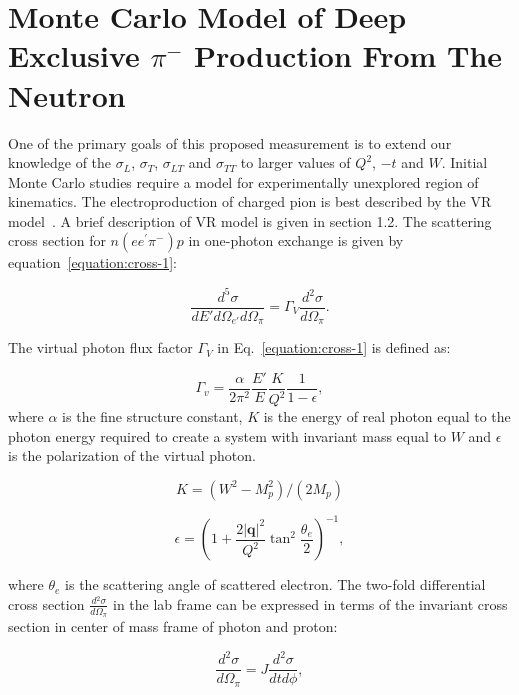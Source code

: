 
\section{Monte Carlo Model of Deep Exclusive $\pi^{-}$ Production From The Neutron}
One of the primary goals of this proposed measurement is to extend our knowledge of the $\sigma_{L}$, $\sigma_{T}$, $\sigma_{LT}$ 
and $\sigma_{TT}$ to larger values of $Q^2$, $-t$ and $W$. Initial Monte Carlo studies require a model for experimentally 
unexplored region of kinematics. The electroproduction of charged pion is best described by the VR model~\cite{vr}. A brief 
description of VR model is given in section 1.2. The scattering cross section for $n(ee^{\prime}\pi^{-})p$ in one-photon exchange 
is given by equation~\ref{equation:cross-1}:

\begin{equation}
  \frac{d^{5} \sigma}{dE' d\Omega_{e'} d\Omega_{\pi}} = \Gamma_{V} \frac{d{^2} \sigma}{d\Omega_{\pi}}.
  \label{equation:cross-1}
\end{equation}

The virtual photon flux factor $\Gamma_{V}$ in Eq.~\ref{equation:cross-1} is defined as:

\begin{equation}
  \Gamma_v=\frac{\alpha}{2\pi^2} \frac{E'}{E} \frac{K}{Q^2}\frac{1}{1-\epsilon},
  \label{equation:photon-flux-1}
\end{equation}
where $\alpha$ is the fine structure constant, $K$ is the energy of real photon equal to the photon energy required to create 
a system with invariant mass equal to $W$ and $\epsilon$ is the polarization of the virtual photon. 

\begin{equation}
  K=(W^2-M_p^2)/(2 M_p)
  \label{equation:photon-flux-2}
\end{equation}

\begin{equation}
  \epsilon=\left(1+\frac{2 |\mathbf{q}|^2}{Q^2} \tan^2\frac{\theta_{e}}{2} \right)^{-1},
  \label{equation:photon-flux-3}
\end{equation}

where $\theta_{e}$ is the scattering angle of scattered electron. The two-fold differential cross section 
$\frac{d{^2} \sigma}{d\Omega_{\pi}}$ in the lab frame can be expressed in terms of the invariant cross section in center of 
mass frame of photon and proton:

\begin{equation}
  \frac{d^2 \sigma}{d\Omega_\pi}= J \frac{d^2 \sigma}{dt d\phi},
  \label{equation:cross-2}
\end{equation}

